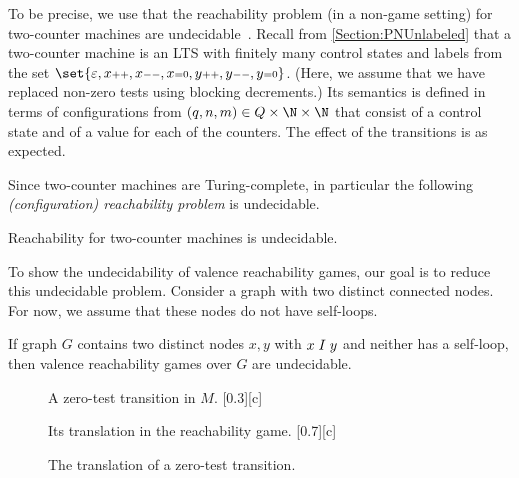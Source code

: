 \documentclass[../../diss.tex]{subfiles}
\begin{document}
To be precise, we use that the reachability problem (in a non-game setting) for two-counter machines are undecidable~\cite{Minsky67}.
Recall from \cref{Section:PNUnlabeled} that a two-counter machine is an LTS with finitely many control states and labels from the set $\set{\eps, \incop{x},\decop{x},\zeroop{x},\incop{y},\decop{y},\zeroop{y}}$.
(Here, we assume that we have replaced non-zero tests using blocking decrements.)
Its semantics is defined in terms of configurations from $(q,n,m) \in Q \times \N \times \N$ that consist of a control state and of a value for each of the counters.
The effect of the transitions is as expected.

Since two-counter machines are Turing-complete, in particular the following \emph{(configuration) reachability problem} is undecidable.

\begin{problem}
\end{problem}

\begin{theorem}
    Reachability for two-counter machines is undecidable.
\end{theorem}

To show the undecidability of valence reachability games, our goal is to reduce this undecidable problem.
Consider a graph with two distinct connected nodes.
For now, we assume that these nodes do not have self-loops.

\begin{proposition}%
\label{Proposition:ValenceReachabilityGamesUndecidableNoEdges}%
    If graph $G$ contains two distinct nodes $x,y$ with $x \mathrel{I} y$ and neither has a self-loop, then valence reachability games over $G$ are undecidable.
\end{proposition}

\begin{figure}[t]
    {%
        \centering%
        \subcaptionbox%
        {%
            A zero-test transition in $M$.%
            \label{Figure:ValenceReachabilityGamesZerotestOriginal}%
        }[0.3\textwidth][c]%
        {%
            
        }%
    }%
    {%
    \centering%
    \subcaptionbox%
        {%
            Its translation in the reachability game.%
            \label{Figure:ValenceReachabilityGamesZerotestTranslation}%
        }[0.7\textwidth][c]%
        {%
            
        }%
    }%
    \caption{The translation of a zero-test transition.}%
    \label{Figure:ValenceReachabilityGamesZerotest}%
\end{figure}
\end{document}
